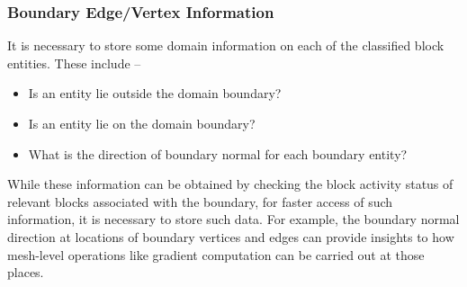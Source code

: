 \documentclass[a4paper,12pt]{article}
\begin{document}
\subsubsection{Boundary Edge/Vertex Information}
It is necessary to store some domain information on each of the classified block entities. These include -- 
\begin{itemize}
	\item Is an entity lie outside the domain boundary?
	\item Is an entity lie on the domain boundary?
	\item What is the direction of boundary normal for each boundary entity? 
\end{itemize} 

While these information can be obtained by checking the block activity status of relevant blocks associated with the boundary, for faster access of such information, it is necessary to store such data. For example, the boundary normal direction at locations of boundary vertices and edges can provide insights to how mesh-level operations like gradient computation can be carried out at those places.   

\end{document}
